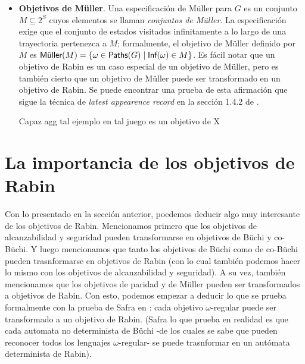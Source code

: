 \begin{itemize}
	\item \textbf{Objetivos de Müller}. Una especificación de Müller para \(G\) es un conjunto \(M\subseteq2^S\) cuyos elementos se llaman \emph{conjuntos de Müller}. La especificación exige que el conjunto de estados visitados infinitamente a lo largo de una trayectoria pertenezca a \(M\); formalmente, el objetivo de Müller definido por \(M\) es $\Muller(M)=\{\omega\in \Paths(G) \mid \Inf(\omega)\in M\}$. Es fácil notar que un objetivo de Rabin es un caso especial de un objetivo de Müller, pero es también cierto que un objetivo de Müller puede ser transformado en un objetivo de Rabin. Se puede encontrar una prueba de esta afirmación que sigue la técnica de \emph{latest appearence record} en la sección 1.4.2 de \cite{AutomataLogicsInfiniteGames}.

	      Capaz agg tal ejemplo en tal juego es un objetivo de X
\end{itemize}





\section{La importancia de los objetivos de Rabin}

Con lo presentado en la sección anterior, poedemos deducir algo muy interesante
de los objetivos de Rabin. Mencionamos primero que los objetivos de
alcanzabilidad y seguridad pueden transformarse en objetivos de Büchi y
co-Büchi. Y luego mencionamos que tanto los objetivos de Büchi como de co-Büchi
pueden trasnformarse en objetivos de Rabin (con lo cual también podemos hacer
lo mismo con los objetivos de alcanzabilidad y seguridad). A su vez, también
mencionamos que los objetivos de paridad y de Müller pueden ser transformados a
objetivos de Rabin. Con esto, podemos empezar a deducir lo que se prueba
formalmente con la prueba de Safra en \cite{Safra}: cada objetivo
$\omega$-regular puede ser transformado a un objetivo de Rabin. (Safra lo que
prueba en realidad es que cada automata no determinista de Büchi -de los cuales
se sabe que pueden reconocer todos los lenguajes $\omega$-regular- se puede
trasnformar en un autómata determinista de Rabin).

